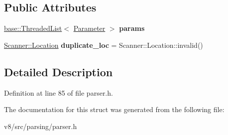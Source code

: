 \subsection*{Public Attributes}
\begin{DoxyCompactItemize}
\item 
\mbox{\label{structv8_1_1internal_1_1ParserFormalParameters_a441509f2a7f7a1863b818e6d0906c644}} 
\mbox{\hyperlink{classv8_1_1base_1_1ThreadedListBase}{base\+::\+Threaded\+List}}$<$ \mbox{\hyperlink{structv8_1_1internal_1_1ParserFormalParameters_1_1Parameter}{Parameter}} $>$ {\bfseries params}
\item 
\mbox{\label{structv8_1_1internal_1_1ParserFormalParameters_ab799ee51f74b49e7b939f86fcf83d818}} 
\mbox{\hyperlink{structv8_1_1internal_1_1Scanner_1_1Location}{Scanner\+::\+Location}} {\bfseries duplicate\+\_\+loc} = Scanner\+::\+Location\+::invalid()
\end{DoxyCompactItemize}


\subsection{Detailed Description}


Definition at line 85 of file parser.\+h.



The documentation for this struct was generated from the following file\+:\begin{DoxyCompactItemize}
\item 
v8/src/parsing/parser.\+h\end{DoxyCompactItemize}
